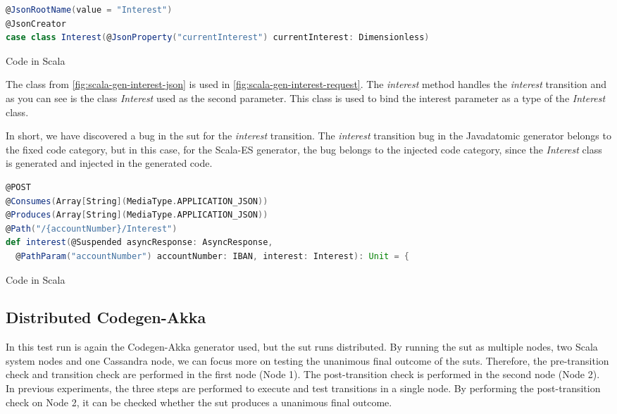 \begin{sourcecode}[h!]
\begin{lstlisting}[language=scala]
@JsonRootName(value = "Interest")
@JsonCreator
case class Interest(@JsonProperty("currentInterest") currentInterest: Dimensionless)
\end{lstlisting}
\caption{Code in Scala}\label{fig:scala-gen-interest-json}
\end{sourcecode}
\FloatBarrier

The class from \autoref{fig:scala-gen-interest-json} is used in
\autoref{fig:scala-gen-interest-request}. The \textit{interest} method handles
the \textit{interest} transition and as you can see is the class \textit{Interest} used
as the second parameter. This class is used to bind the interest parameter as a
type of the \textit{Interest} class.

In short, we have discovered a bug in the \gls{sut}
for the \textit{interest} transition. The \textit{interest} transition bug in the Javadatomic
generator belongs to the fixed code category, but in this case, for the Scala-ES
generator, the bug belongs to the injected code category, since the
\textit{Interest} class is generated and injected in the generated code.

\begin{sourcecode}[h!]
\begin{lstlisting}[language=scala]
@POST
@Consumes(Array[String](MediaType.APPLICATION_JSON))
@Produces(Array[String](MediaType.APPLICATION_JSON))
@Path("/{accountNumber}/Interest")
def interest(@Suspended asyncResponse: AsyncResponse,
  @PathParam("accountNumber") accountNumber: IBAN, interest: Interest): Unit = {
\end{lstlisting}
\caption{Code in Scala}\label{fig:scala-gen-interest-request}
\end{sourcecode}
\FloatBarrier


\subsection{Distributed Codegen-Akka}\label{sec:bug-dist-nodes}
In this test run is again the Codegen-Akka generator used, but the \gls{sut}
runs distributed. By running the \gls{sut} as multiple nodes, two Scala system
nodes and one Cassandra node, we can focus more on testing the unanimous final
outcome of the \gls{sut}s. Therefore, the pre-transition check and transition
check are performed in the first node (Node 1). The post-transition check is
performed in the second node (Node 2). In previous experiments, the three steps
are performed to execute and test transitions in a single node. By performing
the post-transition check on Node 2, it can be checked whether the
\gls{sut} produces a unanimous final outcome.

